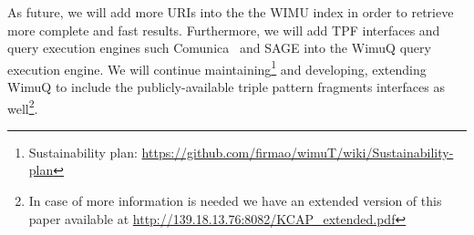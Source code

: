 As future, we will add more URIs into the the WIMU index in order to retrieve more complete and fast results. Furthermore, we will add TPF interfaces and query execution engines such Comunica~\cite{taelman2018comunica} and SAGE \cite{DBLP:journals/corr/abs-1806-00227} into the WimuQ query execution engine. We will continue maintaining\footnote{Sustainability plan: \url{https://github.com/firmao/wimuT/wiki/Sustainability-plan}} and developing, extending WimuQ to include the publicly-available triple pattern fragments interfaces as well\footnote{\label{note1}In case of more information is needed we have an extended version of this paper available at \url{http://139.18.13.76:8082/KCAP_extended.pdf}}.


